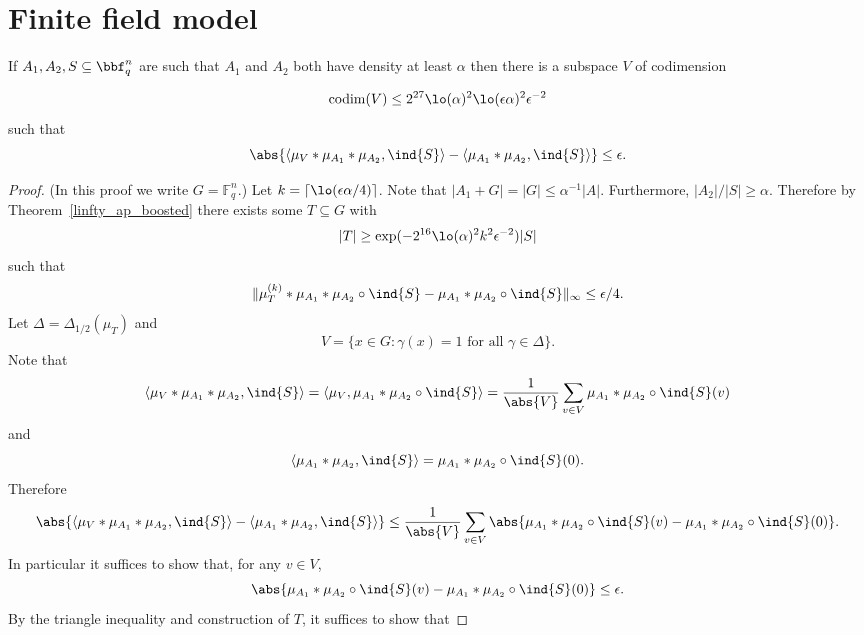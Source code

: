 \chapter{Finite field model}

\begin{theorem}
  \label{ap_in_ff}
\leanok
If $A_1,A_2,S\subseteq \bbf_q^n$ are such that $A_1$ and $A_2$ both have density at least $\alpha$ then there is a subspace $V$ of codimension

\[\mathrm{codim}(V)\leq 2^{27}\lo(\alpha)^2\lo(\epsilon \alpha)^2\epsilon^{-2}\]
such that
\[\abs{\langle \mu_V\ast \mu_{A_1}\ast \mu_{A_2},\ind{S}\rangle-\langle \mu_{A_1}\ast \mu_{A_2},\ind{S}\rangle}\leq \epsilon.\]
\end{theorem}

\begin{proof}
\leanok
(In this proof we write $G=\mathbb{F}_q^n$.) Let $k=\lceil \lo(\epsilon\alpha/4)\rceil$. Note that $\lvert A_1+G\rvert=\lvert G\rvert\leq \alpha^{-1}\lvert A\rvert$. Furthermore, $\lvert A_2\rvert/\lvert S\rvert\geq \alpha$. Therefore by Theorem~\ref{linfty_ap_boosted} there exists some $T\subseteq G$ with
\[\lvert T\rvert \geq \exp(-2^{16}\lo(\alpha)^2k^2\epsilon^{-2})\lvert S\rvert\]
such that
\[\| \mu_T^{(k)}\ast \mu_{A_1}\ast \mu_{A_2}\circ \ind{S}-\mu_{A_1}\ast \mu_{A_2}\circ \ind{S}\|_{\infty}\leq \epsilon/4.\]
Let $\Delta=\Delta_{1/2}(\mu_T)$ and
\[V = \{ x \in G : \gamma(x)=1\textrm{ for all }\gamma\in\Delta\}.\]
Note that
\[\langle \mu_V\ast \mu_{A_1}\ast \mu_{A_2},\ind{S}\rangle = \langle \mu_V,\mu_{A_1}\ast \mu_{A_2}\circ \ind{S}\rangle=\frac{1}{\abs{V}}\sum_{v\in V}\mu_{A_1}\ast \mu_{A_2}\circ \ind{S}(v)\]
and
\[\langle \mu_{A_1}\ast \mu_{A_2},\ind{S}\rangle = \mu_{A_1}\ast \mu_{A_2}\circ\ind{S}(0).\]
Therefore
\[\abs{\langle \mu_V\ast \mu_{A_1}\ast \mu_{A_2},\ind{S}\rangle-\langle \mu_{A_1}\ast \mu_{A_2},\ind{S}\rangle}\leq \frac{1}{\abs{V}}\sum_{v\in V}\abs{\mu_{A_1}\ast \mu_{A_2}\circ \ind{S}(v)-\mu_{A_1}\ast \mu_{A_2}\circ \ind{S}(0)}.\]
In particular it suffices to show that, for any $v\in V$,
\[\abs{\mu_{A_1}\ast \mu_{A_2}\circ \ind{S}(v)-\mu_{A_1}\ast \mu_{A_2}\circ \ind{S}(0)}\leq \epsilon.\]
By the triangle inequality and construction of $T$, it suffices to show that


\end{proof}
